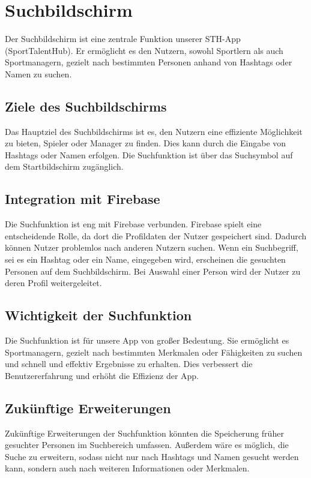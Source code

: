 \chapter{Suchbildschirm}

Der Suchbildschirm ist eine zentrale Funktion unserer STH-App (SportTalentHub). Er ermöglicht es den Nutzern, sowohl Sportlern als auch Sportmanagern, gezielt nach bestimmten Personen anhand von Hashtags oder Namen zu suchen.

\section{Ziele des Suchbildschirms}

Das Hauptziel des Suchbildschirms ist es, den Nutzern eine effiziente Möglichkeit zu bieten, Spieler oder Manager zu finden. Dies kann durch die Eingabe von Hashtags oder Namen erfolgen. Die Suchfunktion ist über das Suchsymbol auf dem Startbildschirm zugänglich.

\section{Integration mit Firebase}

Die Suchfunktion ist eng mit Firebase verbunden. Firebase spielt eine entscheidende Rolle, da dort die Profildaten der Nutzer gespeichert sind. Dadurch können Nutzer problemlos nach anderen Nutzern suchen. Wenn ein Suchbegriff, sei es ein Hashtag oder ein Name, eingegeben wird, erscheinen die gesuchten Personen auf dem Suchbildschirm. Bei Auswahl einer Person wird der Nutzer zu deren Profil weitergeleitet.

\section{Wichtigkeit der Suchfunktion}

Die Suchfunktion ist für unsere App von großer Bedeutung. Sie ermöglicht es Sportmanagern, gezielt nach bestimmten Merkmalen oder Fähigkeiten zu suchen und schnell und effektiv Ergebnisse zu erhalten. Dies verbessert die Benutzererfahrung und erhöht die Effizienz der App.

\section{Zukünftige Erweiterungen}

Zukünftige Erweiterungen der Suchfunktion könnten die Speicherung früher gesuchter Personen im Suchbereich umfassen. Außerdem wäre es möglich, die Suche zu erweitern, sodass nicht nur nach Hashtags und Namen gesucht werden kann, sondern auch nach weiteren Informationen oder Merkmalen.